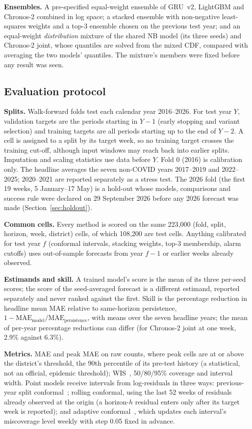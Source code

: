 \textbf{Ensembles.} A pre-specified equal-weight ensemble of GRU~v2, LightGBM and Chronos-2 combined in log space; a stacked ensemble with non-negative least-squares weights and a top-3 ensemble chosen on the previous test year; and an equal-weight \emph{distribution} mixture of the shared NB model (its three seeds) and Chronos-2 joint, whose quantiles are solved from the mixed CDF, compared with averaging the two models' quantiles. The mixture's members were fixed before any result was seen.

\subsection{Evaluation protocol}
\textbf{Splits.} Walk-forward folds test each calendar year 2016--2026. For test year $Y$, validation targets are the periods starting in $Y-1$ (early stopping and variant selection) and training targets are all periods starting up to the end of $Y-2$. A cell is assigned to a split by its target week, so no training target crosses the training cut-off, although input windows may reach back into earlier splits. Imputation and scaling statistics use data before $Y$. Fold 0 (2016) is calibration only. The headline averages the seven non-COVID years 2017--2019 and 2022--2025; 2020--2021 are reported separately as a stress test. The 2026 fold (the first 19 weeks, 5 January--17 May) is a hold-out whose models, comparisons and success rule were declared on 29 September 2026 before any 2026 forecast was made (Section~\ref{sec:holdout}).

\textbf{Common cells.} Every method is scored on the same 223{,}000 (fold, split, horizon, week, district) cells, of which 108{,}200 are test cells. Anything calibrated for test year $f$ (conformal intervals, stacking weights, top-3 membership, alarm cutoffs) uses out-of-sample forecasts from year $f-1$ or earlier weeks already observed.

\textbf{Estimands and skill.} A trained model's score is the mean of its three per-seed scores; the score of the seed-averaged forecast is a different estimand, reported separately and never ranked against the first. Skill is the percentage reduction in headline mean MAE relative to same-horizon persistence, $1-\overline{\mathrm{MAE}}_{\text{model}}/\overline{\mathrm{MAE}}_{\text{persistence}}$, with means over the seven headline years; the mean of per-year percentage reductions can differ (for Chronos-2 joint at one week, 2.9\% against 6.3\%).

\textbf{Metrics.} MAE and peak MAE on raw counts, where peak cells are at or above the district's threshold, the 90th percentile of its pre-test history (a statistical, not an official, epidemic threshold); WIS~\cite{bracher2021evaluating}, 50/80/95\% coverage and interval width. Point models receive intervals from log-residuals in three ways: previous-year split conformal~\cite{vovk2005algorithmic}; rolling conformal, using the last 52 weeks of residuals already observed at the origin (a horizon-$h$ residual enters only after its target week is reported); and adaptive conformal~\cite{gibbs2021adaptive}, which updates each interval's miscoverage level weekly with step 0.05 fixed in advance.

